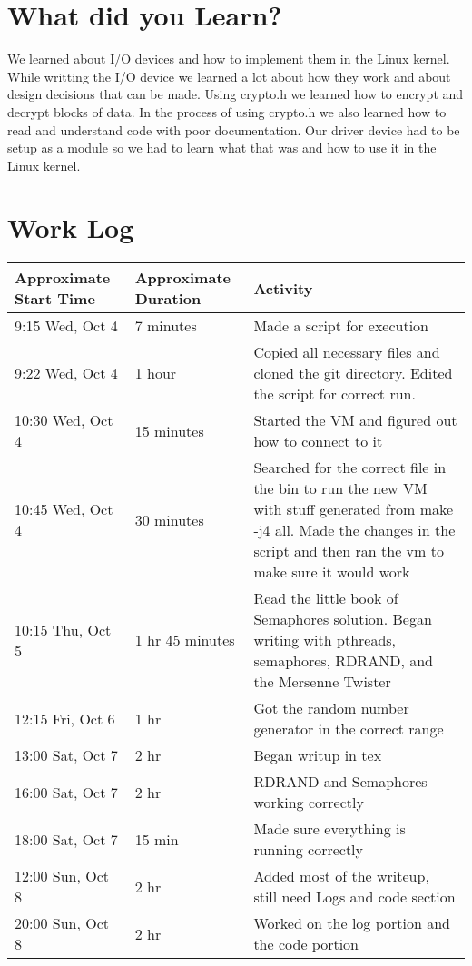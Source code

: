 \documentclass[10pt,drafclsnofoot,onecolumn]{article}
\begin{document}
\section{What did you Learn?}
We learned about I/O devices and how to implement them in the Linux kernel.
While writting the I/O device we learned a lot about how they work and about design decisions that can be made.
Using crypto.h we learned how to encrypt and decrypt blocks of data.
In the process of using crypto.h we also learned how to read and understand code with poor documentation.
Our driver device had to be setup as a module so we had to learn what that was and how to use it in the Linux kernel.

\section{Work Log}
\begin{tabular}{|p{5cm}|p{5cm}|p{5cm}}
\textbf{Approximate Start Time} & \textbf{Approximate Duration} & \textbf{Activity} \\
\hline
9:15 Wed, Oct 4 & 7 minutes & Made a script for execution \\\hline
9:22 Wed, Oct 4 & 1 hour & Copied all necessary files and cloned the git directory. Edited the script for correct run. \\\hline
10:30 Wed, Oct 4 & 15 minutes & Started the VM and figured out how to connect to it \\\hline
10:45 Wed, Oct 4 & 30 minutes & Searched for the correct file in the bin to run the new VM with stuff generated from make -j4 all. Made the changes in the script and then ran the vm to make sure it would work \\
10:15 Thu, Oct 5 & 1 hr 45 minutes & Read the little book of Semaphores solution. Began writing with pthreads, semaphores, RDRAND, and the Mersenne Twister \\\hline
12:15 Fri, Oct 6 & 1 hr & Got the random number generator in the correct range \\\hline
13:00 Sat, Oct 7 & 2 hr & Began writup in tex \\\hline
16:00 Sat, Oct 7 & 2 hr & RDRAND and Semaphores working correctly \\\hline
18:00 Sat, Oct 7 & 15 min & Made sure everything is running correctly \\\hline
12:00 Sun, Oct 8 & 2 hr & Added most of the writeup, still need Logs and code section \\\hline
20:00 Sun, Oct 8 & 2 hr & Worked on the log portion and the code portion \\\hline
\end{tabular}
\\
\\
\end{document}
